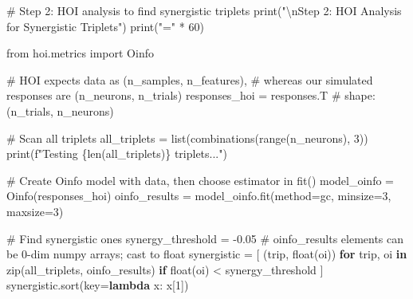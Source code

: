 \documentclass[
  11pt,
  letterpaper,
  oneside,
  openany]{book}
\newenvironment{Shaded}{\begin{snugshade}}{\end{snugshade}}
\newcommand{\BuiltInTok}[1]{\textcolor[rgb]{0.00,0.23,0.31}{#1}}
\newcommand{\CharTok}[1]{\textcolor[rgb]{0.13,0.47,0.30}{#1}}
\newcommand{\CommentTok}[1]{\textcolor[rgb]{0.37,0.37,0.37}{#1}}
\newcommand{\ControlFlowTok}[1]{\textcolor[rgb]{0.00,0.23,0.31}{\textbf{#1}}}
\newcommand{\DecValTok}[1]{\textcolor[rgb]{0.68,0.00,0.00}{#1}}
\newcommand{\FloatTok}[1]{\textcolor[rgb]{0.68,0.00,0.00}{#1}}
\newcommand{\ImportTok}[1]{\textcolor[rgb]{0.00,0.46,0.62}{#1}}
\newcommand{\KeywordTok}[1]{\textcolor[rgb]{0.00,0.23,0.31}{\textbf{#1}}}
\newcommand{\NormalTok}[1]{\textcolor[rgb]{0.00,0.23,0.31}{#1}}
\newcommand{\OperatorTok}[1]{\textcolor[rgb]{0.37,0.37,0.37}{#1}}
\newcommand{\SpecialCharTok}[1]{\textcolor[rgb]{0.37,0.37,0.37}{#1}}
\newcommand{\SpecialStringTok}[1]{\textcolor[rgb]{0.13,0.47,0.30}{#1}}
\newcommand{\StringTok}[1]{\textcolor[rgb]{0.13,0.47,0.30}{#1}}
\begin{document}
\begin{Shaded}
\begin{Highlighting}[]
\CommentTok{\# Step 2: HOI analysis to find synergistic triplets}
\BuiltInTok{print}\NormalTok{(}\StringTok{"}\CharTok{\textbackslash{}n}\StringTok{Step 2: HOI Analysis for Synergistic Triplets"}\NormalTok{)}
\BuiltInTok{print}\NormalTok{(}\StringTok{"="} \OperatorTok{*} \DecValTok{60}\NormalTok{)}

\ImportTok{from}\NormalTok{ hoi.metrics }\ImportTok{import}\NormalTok{ Oinfo}

\CommentTok{\# HOI expects data as (n\_samples, n\_features),}
\CommentTok{\# whereas our simulated responses are (n\_neurons, n\_trials)}
\NormalTok{responses\_hoi }\OperatorTok{=}\NormalTok{ responses.T  }\CommentTok{\# shape: (n\_trials, n\_neurons)}

\CommentTok{\# Scan all triplets}
\NormalTok{all\_triplets }\OperatorTok{=} \BuiltInTok{list}\NormalTok{(combinations(}\BuiltInTok{range}\NormalTok{(n\_neurons), }\DecValTok{3}\NormalTok{))}
\BuiltInTok{print}\NormalTok{(}\SpecialStringTok{f"Testing }\SpecialCharTok{\{}\BuiltInTok{len}\NormalTok{(all\_triplets)}\SpecialCharTok{\}}\SpecialStringTok{ triplets..."}\NormalTok{)}

\CommentTok{\# Create Oinfo model with data, then choose estimator in fit()}
\NormalTok{model\_oinfo }\OperatorTok{=}\NormalTok{ Oinfo(responses\_hoi)}
\NormalTok{oinfo\_results }\OperatorTok{=}\NormalTok{ model\_oinfo.fit(method}\OperatorTok{=}\StringTok{\textquotesingle{}gc\textquotesingle{}}\NormalTok{, minsize}\OperatorTok{=}\DecValTok{3}\NormalTok{, maxsize}\OperatorTok{=}\DecValTok{3}\NormalTok{)}

\CommentTok{\# Find synergistic ones}
\NormalTok{synergy\_threshold }\OperatorTok{=} \OperatorTok{{-}}\FloatTok{0.05}
\CommentTok{\# oinfo\_results elements can be 0{-}dim numpy arrays; cast to float}
\NormalTok{synergistic }\OperatorTok{=}\NormalTok{ [}
\NormalTok{    (trip, }\BuiltInTok{float}\NormalTok{(oi))}
    \ControlFlowTok{for}\NormalTok{ trip, oi }\KeywordTok{in} \BuiltInTok{zip}\NormalTok{(all\_triplets, oinfo\_results)}
    \ControlFlowTok{if} \BuiltInTok{float}\NormalTok{(oi) }\OperatorTok{\textless{}}\NormalTok{ synergy\_threshold}
\NormalTok{]}
\NormalTok{synergistic.sort(key}\OperatorTok{=}\KeywordTok{lambda}\NormalTok{ x: x[}\DecValTok{1}\NormalTok{])}


\end{Highlighting}
\end{Shaded}
\end{document}
